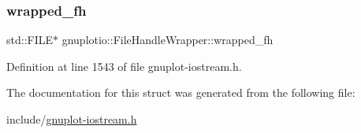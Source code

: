\mbox{\label{structgnuplotio_1_1_file_handle_wrapper_adcb58bfcd9dbdba000a7e7395bee2ef9}} 
\subsubsection{\texorpdfstring{wrapped\+\_\+fh}{wrapped\_fh}}
{\footnotesize\ttfamily std\+::\+F\+I\+LE$\ast$ gnuplotio\+::\+File\+Handle\+Wrapper\+::wrapped\+\_\+fh}



Definition at line 1543 of file gnuplot-\/iostream.\+h.



The documentation for this struct was generated from the following file\+:\begin{DoxyCompactItemize}
\item 
include/\hyperlink{gnuplot-iostream_8h}{gnuplot-\/iostream.\+h}\end{DoxyCompactItemize}

